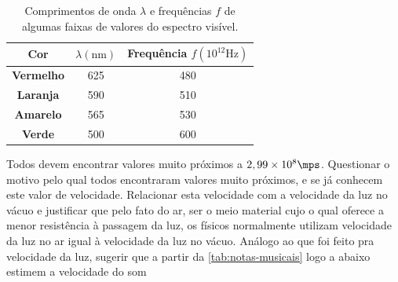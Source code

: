     \begin{table}[!ht]
        \centering
        \begin{tabular}{|c|c|c|}
        \hline
        \textbf{Cor}      & \textbf{$\lambda(\textrm{nm})$} & \textbf{Frequência $f(10^{12}\textrm{Hz})$} \\ \hline
        \textbf{Vermelho} & 625                             & 480                                         \\ \hline
        \textbf{Laranja}  & 590                             & 510                                         \\ \hline
        \textbf{Amarelo}  & 565                             & 530                                         \\ \hline
        \textbf{Verde}    & 500                             & 600                                         \\ \hline
        \end{tabular}
        \caption{Comprimentos de onda $\lambda$ e frequências $f$ de algumas faixas de valores do espectro visível.}
        \label{tab:alguns-espectros-do-visivel}
    \end{table}
    \vspace*{10pt}

    \noindent Todos devem encontrar valores muito próximos a $2,99\times 10^8\mps$. Questionar o motivo pelo qual todos encontraram valores muito próximos, e se já conhecem este valor de velocidade. Relacionar esta velocidade com a velocidade da luz no vácuo e justificar que pelo fato do ar, ser o meio material cujo o qual oferece a menor resistência à passagem da luz, os físicos normalmente utilizam velocidade da luz no ar igual à velocidade da luz no vácuo.
    \newpage
    Análogo ao que foi feito pra velocidade da luz, sugerir que a partir da \autoref{tab:notas-musicais} logo a abaixo estimem a velocidade do som
    \vspace*{10pt}
    
